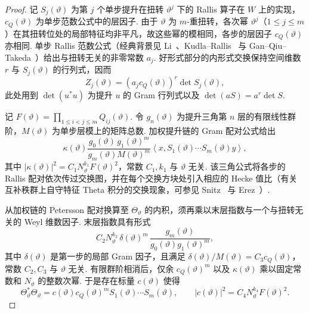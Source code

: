 \begin{proof}
记 $S_j(\vartheta)$ 为第 $j$ 个单步提升在扭转 $\vartheta^j$ 下的 Rallis 算子在 $W$ 上的实现，$c_Q(\vartheta)$ 为单步范数公式中的层因子. 由于 $\vartheta$ 为 $m$-重扭转，各次幂 $\vartheta^j$（$1\le j\le m$）在其扭转位处的局部特征均非平凡，故这些幂的模相同，各步的层因子 $c_Q(\vartheta)$ 亦相同. 单步 Rallis 范数公式（经典背景见 Li~\cite{Li1992}、Kudla--Rallis~\cite{KudlaRallis1994} 与 Gan--Qiu--Takeda~\cite{GQT2014}）给出与扭转无关的非零常数 $a_j$. 好形式部分的内形式交换保持空间维数 $r$ 与 $S_j(\vartheta)$ 的行列式，因而
\[
 Z_j(\vartheta)=(a_j c_Q(\vartheta))^r\det S_j(\vartheta),
\]
此处用到 $\det(u^*u)$ 为提升 $u$ 的 Gram 行列式以及 $\det(aS)=a^r\det S$.

记 $F(\vartheta)=\prod_{1\le i<j\le m}Q_{ij}(\vartheta)$. 令 $g_n(\vartheta)$ 为提升三角第 $n$ 层的有限线性群阶，$M(\vartheta)$ 为单步层模上的矩阵总数. 加权提升链的 Gram 配对公式给出
\[
 \kappa(\vartheta)
 \frac{g_0(\vartheta)\,g_1(\vartheta)^m}{g_m(\vartheta) M(\vartheta)^m}
 \left\langle x,
     S_1(\vartheta)\cdots S_m(\vartheta)y\right\rangle,
\]
其中 $|\kappa(\vartheta)|^2=C_1N_\vartheta^{k_1}F(\vartheta)^2$，常数 $C_1,k_1$ 与 $\vartheta$ 无关. 该三角公式将各步的 Rallis 配对依次传过交换图，并在每个交换方块处引入相应的 Hecke 值比（有关互补秩群上自守特征 Theta 积分的交换现象，可参见 Snitz~\cite{Snitz2007} 与 Erez~\cite{Erez2024}）.

从加权链的 Petersson 配对换算至 $\Theta_\vartheta$ 的内积，须再乘以末层指数与一个与扭转无关的 Weyl 维数因子. 末层指数具有形式
\[
 C_2 N_\vartheta^{k_2}\,\delta(\vartheta)^m\,
     \frac{g_m(\vartheta)}{g_0(\vartheta)g_1(\vartheta)^m},
\]
其中 $\delta(\vartheta)$ 是第一步的局部 Gram 因子，且满足 $\delta(\vartheta)/M(\vartheta)=C_3c_Q(\vartheta)$，常数 $C_2,C_3$ 与 $\vartheta$ 无关. 有限群阶相消后，仅余 $c_Q(\vartheta)^m$ 以及 $\kappa(\vartheta)$ 乘以固定常数和 $N_\vartheta$ 的整数次幂. 于是存在标量 $c(\vartheta)$ 使得
\[
 \Theta_\vartheta^*\Theta_\vartheta
   =c(\vartheta)c_Q(\vartheta)^m S_1(\vartheta)\cdots S_m(\vartheta),
 \qquad
 |c(\vartheta)|^2=C_4N_\vartheta^{k_4}F(\vartheta)^2 .
\]


\end{proof}
